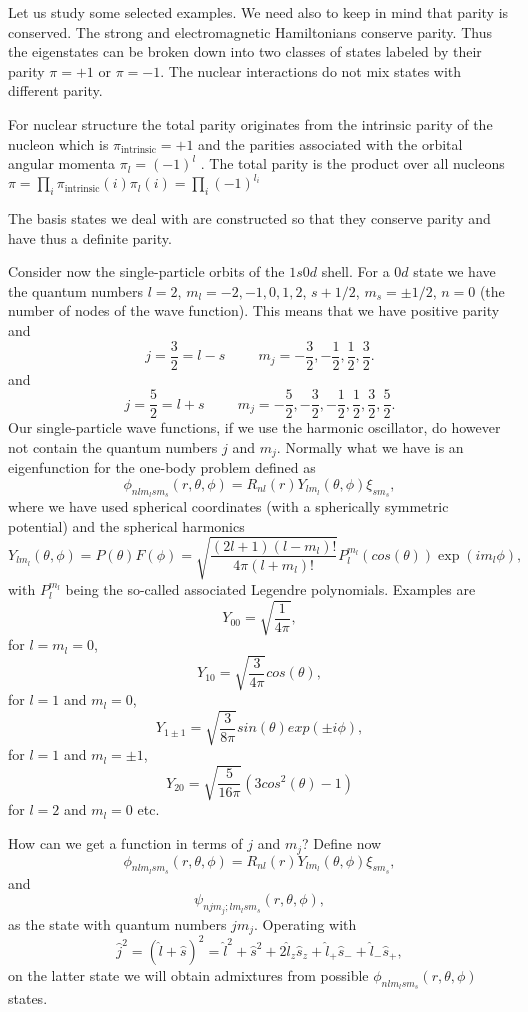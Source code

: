 \documentclass[graybox,sectrefs,envcountresetchap,open=right]{svmonodo}
\begin{document}
Let us study some selected examples. We need also to keep in mind that parity is conserved.
The strong and electromagnetic Hamiltonians conserve parity. Thus the eigenstates can be
broken down into two classes of states labeled by their parity $\pi= +1$ or $\pi=-1$.
The nuclear interactions do not mix states with different parity.

For nuclear structure the total parity originates
from the intrinsic parity of the nucleon which is $\pi_{\mathrm{intrinsic}}=+1$ 
and the parities associated with
the orbital angular momenta $\pi_l=(-1)^l$ . The total parity is the product over all nucleons
$\pi = \prod_i \pi_{\mathrm{intrinsic}}(i)\pi_l(i) = \prod_i (-1)^{l_i}$

The basis states we deal with are constructed so that they conserve parity and have thus a definite parity. 

Consider now the single-particle orbits of the $1s0d$ shell. 
For a $0d$ state we have the quantum numbers $l=2$, $m_l=-2,-1,0,1,2$, $s+1/2$, $m_s=\pm 1/2$,
$n=0$ (the number of nodes of the wave function).   This means that we have positive parity and
\[
j=\frac{3}{2}=l-s\hspace{1cm} m_j=-\frac{3}{2},-\frac{1}{2},\frac{1}{2},\frac{3}{2}.
\]
and
\[
j=\frac{5}{2}=l+s\hspace{1cm} m_j=-\frac{5}{2},-\frac{3}{2},-\frac{1}{2},\frac{1}{2},\frac{3}{2},\frac{5}{2}.
\]
Our single-particle wave functions, if we use the harmonic oscillator, do however not contain the quantum numbers $j$ and $m_j$.
Normally what we have is an eigenfunction for the one-body problem defined as
\[
\phi_{nlm_lsm_s}(r,\theta,\phi)=R_{nl}(r)Y_{lm_l}(\theta,\phi)\xi_{sm_s},
\]
where we have used spherical coordinates (with a spherically symmetric potential) and the spherical harmonics
\[
    Y_{lm_l}(\theta,\phi)=P(\theta)F(\phi)=\sqrt{\frac{(2l+1)(l-m_l)!}{4\pi (l+m_l)!}}
                      P_l^{m_l}(cos(\theta))\exp{(im_l\phi)},
\]
with $P_l^{m_l}$ being the so-called associated Legendre polynomials. Examples are
\[
   Y_{00}=\sqrt{\frac{1}{4\pi}},
\]
for $l=m_l=0$, 
\[
   Y_{10}=\sqrt{\frac{3}{4\pi}}cos(\theta),
\]
for $l=1$ and $m_l=0$, 
\[
   Y_{1\pm 1}=\sqrt{\frac{3}{8\pi}}sin(\theta)exp(\pm i\phi),
\]
for  $l=1$ and $m_l=\pm 1$, 
\[
   Y_{20}=\sqrt{\frac{5}{16\pi}}(3cos^2(\theta)-1)
\]
for $l=2$ and $m_l=0$ etc. 

\noindent
How can we get a function in terms of $j$ and $m_j$?
Define now
\[
\phi_{nlm_lsm_s}(r,\theta,\phi)=R_{nl}(r)Y_{lm_l}(\theta,\phi)\xi_{sm_s},
\]
and
\[
\psi_{njm_j;lm_lsm_s}(r,\theta,\phi),
\]
as the state with quantum numbers $jm_j$.
Operating with 
\[
   \hat{j}^2=(\hat{l}+\hat{s})^2=\hat{l}^2+\hat{s}^2+2\hat{l}_z\hat{s}_z+\hat{l}_+\hat{s}_{-}+\hat{l}_{-}\hat{s}_{+},
\]
on the latter state we will obtain admixtures from possible $\phi_{nlm_lsm_s}(r,\theta,\phi)$ states.
\end{document}
